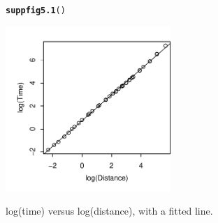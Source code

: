 \documentclass[12pt, a4paper,  BCOR=8.25mm, DIV=15]{scrartcl}\usepackage[]{graphicx}\usepackage[]{color}
\makeatletter
\newcommand{\hlstd}[1]{\textcolor[rgb]{0.345,0.345,0.345}{#1}}%
\newcommand{\hlkwd}[1]{\textcolor[rgb]{0.737,0.353,0.396}{\textbf{#1}}}%
\newenvironment{kframe}{%
 \def\at@end@of@kframe{}%
 \ifinner\ifhmode%
  \def\at@end@of@kframe{\end{minipage}}%
  \begin{minipage}{\columnwidth}%
 \fi\fi%
 \def\FrameCommand##1{\hskip\@totalleftmargin \hskip-\fboxsep
 \colorbox{shadecolor}{##1}\hskip-\fboxsep
     \hskip-\linewidth \hskip-\@totalleftmargin \hskip\columnwidth}%
 \MakeFramed {\advance\hsize-\width
   \@totalleftmargin\z@ \linewidth\hsize
   \@setminipage}}%
 {\par\unskip\endMakeFramed%
 \at@end@of@kframe}
\newenvironment{knitrout}{}{} %
\makeatother
\begin{document}
\begin{suppfigure}
\begin{knitrout}
\color{fgcolor}\begin{kframe}
\begin{alltt}
\hlkwd{suppfig5.1}\hlstd{()}
\end{alltt}
\end{kframe}

{\centering \includegraphics[width=0.47\textwidth]{figs/glm-suppfig5_1e-1} 

}



\end{knitrout}
\caption{log(time) versus log(distance), with a fitted line.}
\end{suppfigure}
\end{document}
